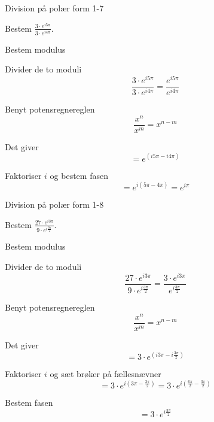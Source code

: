 \documentclass{article}
\begin{document}
\newpage

\begin{exercise}{Division på polær form 1-7}
	
	Bestem $ \frac{3 \cdot e^{i 5\pi}}{3 \cdot e^{i 4\pi}}$.
	
	
	
	\hint 
	
	Bestem modulus
	
	
	\hint
	
	Divider de to moduli
	\[
	\frac{3 \cdot e^{i 5\pi}}{3 \cdot e^{i 4\pi}} = \frac{e^{i 5\pi}}{e^{i 4\pi}}
	\]
	
	\hint 
	
	Benyt potensregnereglen
	\[
	\frac{x^n}{x^m} = x^{n-m}
	\]
	
	\hint
	
	Det giver
	\[
	= e^{(i 5\pi - i 4\pi)}	
	\]
	
	\hint
	
	Faktoriser $i$ og bestem fasen
	\[
	=  e^{i(5\pi - 4\pi)} = e^{i \pi}
	\]
	
	
\end{exercise}

\newpage

\begin{exercise}{Division på polær form 1-8}
	
	Bestem $ \frac{27\cdot e^{i 3 \pi}}{9 \cdot e^{i \frac{3 \pi}{2}}}$.
	
	
	
	\hint 
	
	Bestem modulus
	
	
	\hint
	
	Divider de to moduli
	\[
	\frac{27\cdot e^{i 3 \pi}}{9 \cdot e^{i \frac{3 \pi}{2}}} = \frac{3\cdot e^{i 3 \pi}}{ e^{i \frac{3 \pi}{2}}}
	\]
	
	\hint 
	
	Benyt potensregnereglen
	\[
	\frac{x^n}{x^m} = x^{n-m}
	\]
	
	\hint
	
	Det giver
	\[
	=3\cdot e^{(i 3 \pi- i \frac{3 \pi}{2})} 
	\]
	
	\hint
	
	Faktoriser $i$ og sæt brøker på fællesnævner
	\[
	= 3\cdot e^{i( 3 \pi- \frac{3 \pi}{2})}  = 3 \cdot e^{i( \frac{6 \pi}{2}- \frac{3 \pi}{2})} 
	\]
	
	\hint
	
	Bestem fasen
	\[
	= 3 \cdot e^{i \frac{3\pi}{2}}
	\]
	
\end{exercise}
\end{document}
